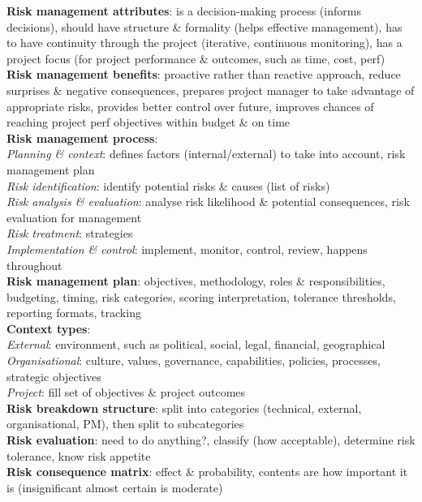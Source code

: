 \documentclass[a4paper]{article}
\begin{document}
\begin{multicols}{3}
        \textbf{Risk management attributes}: is a decision-making process (informs decisions), should have structure \& formality (helps effective management), has to have continuity through the project (iterative, continuous monitoring), has a project focus (for project performance \& outcomes, such as time, cost, perf)\\
        \textbf{Risk management benefits}: proactive rather than reactive approach, reduce surprises \& negative consequences, prepares project manager to take advantage of appropriate risks, provides better control over future, improves chances of reaching project perf objectives within budget \& on time\\
        \textbf{Risk management process}:\\
        \textit{Planning \& context}: defines factors (internal/external) to take into account, risk management plan\\
        \textit{Risk identification}: identify potential risks \& causes (list of risks)\\
        \textit{Risk analysis \& evaluation}: analyse risk likelihood \& potential consequences, risk evaluation for management\\
        \textit{Risk treatment}: strategies\\
        \textit{Implementation \& control}: implement, monitor, control, review, happens throughout\\
        \textbf{Risk management plan}: objectives, methodology, roles \& responsibilities, budgeting, timing, risk categories, scoring interpretation, tolerance thresholds, reporting formats, tracking\\
        \textbf{Context types}:\\
        \textit{External}: environment, such as political, social, legal, financial, geographical\\
        \textit{Organisational}: culture, values, governance, capabilities, policies, processes, strategic objectives\\
        \textit{Project}: fill set of objectives \& project outcomes\\
        \textbf{Risk breakdown structure}: split into categories (technical, external, organisational, PM), then split to subcategories\\
        \textbf{Risk evaluation}: need to do anything?, classify (how acceptable), determine risk tolerance, know risk appetite\\
        \textbf{Risk consequence matrix}: effect \& probability, contents are how important it is (insignificant almost certain is moderate)\\

\end{multicols}
\end{document}
